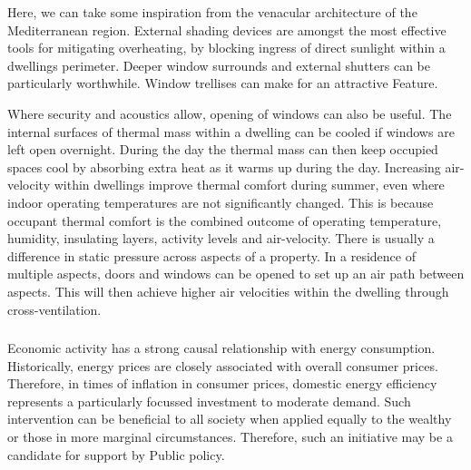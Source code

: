 \documentclass[11pt, oneside]{book}   	%
\begin{document}
Here, we can take some inspiration from the venacular architecture of the Mediterranean region.
External shading devices are amongst the most effective tools for mitigating overheating, by blocking ingress of direct sunlight within a dwellings perimeter.
Deeper window surrounds and external shutters can be particularly worthwhile.
Window trellises can make for an attractive Feature.\

Where security and acoustics allow, opening of windows can also be useful.
The internal surfaces of thermal mass within a dwelling can be cooled if windows are left open overnight.
During the day the thermal mass can then keep occupied spaces cool by absorbing extra heat as it warms up during the day.
Increasing air-velocity within dwellings improve thermal comfort during summer, even where indoor operating temperatures are not significantly changed.
This is because occupant thermal comfort is the combined outcome of operating temperature, humidity, insulating layers, activity levels and air-velocity.
There is usually a difference in static pressure across aspects of a property.
In a residence of multiple aspects, doors and windows can be opened to set up an air path between aspects.
This will then achieve higher air velocities within the dwelling through cross-ventilation.\

\subsubsection{\color{YellowOrange}{P2: Close Control of Domestic Heating}}
Economic activity has a strong causal relationship with energy consumption.
Historically, energy prices are closely associated with overall consumer prices.
Therefore, in times of inflation in consumer prices, domestic energy efficiency represents a particularly focussed investment to moderate demand.
Such intervention can be beneficial to all society when applied equally to the wealthy or those in more marginal circumstances.
Therefore, such an initiative may be a candidate for support by Public policy.\
\end{document}
